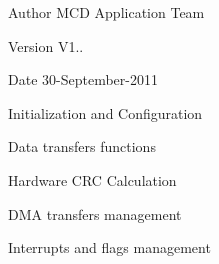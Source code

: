 \begin{DoxyAuthor}{Author}
M\+CD Application Team 
\end{DoxyAuthor}
\begin{DoxyVersion}{Version}
V1.. 
\end{DoxyVersion}
\begin{DoxyDate}{Date}
30-\/\+September-\/2011
\begin{DoxyItemize}
\item Initialization and Configuration
\item Data transfers functions
\item Hardware C\+RC Calculation
\item D\+MA transfers management
\item Interrupts and flags management
\end{DoxyItemize}
\end{DoxyDate}
